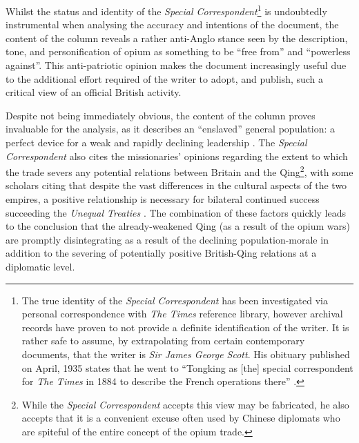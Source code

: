 \documentclass{article}
\begin{document}
        Whilst the status and identity of the \textit{Special Correspondent}\footnote{The true identity of the \textit{Special Correspondent} has been investigated via personal correspondence with \textit{The Times} reference library, however archival records have proven to not provide a definite identification of the writer. It is rather safe to assume, by extrapolating from certain contemporary documents, that the writer is \textit{Sir James George Scott}. His obituary published on  April, 1935 states that he went to ``Tongking as  [the] special correspondent for \textit{The Times} in 1884 to describe the French operations there'' \autocites{TheTimes:1935}{Scott:1885}.} is undoubtedly instrumental when analysing the accuracy and intentions of the document, the content of the column reveals a rather anti-Anglo stance seen by the description, tone, and personification of opium as something to be ``free from'' and ``powerless against''. This anti-patriotic opinion makes the document increasingly useful due to the additional effort required of the writer to adopt, and publish, such a critical view of an official British activity.

        Despite not being immediately obvious, the content of the column proves invaluable for the analysis, as it describes an ``enslaved'' general population: a perfect device for a weak and rapidly declining leadership \autocite{Rotberg:2003}. The \textit{Special Correspondent} also cites the missionaries' opinions regarding the extent to which the trade severs any potential relations between Britain and the Qing\footnote{While the \textit{Special Correspondent} accepts this view may be fabricated, he also accepts that it is a convenient excuse often used by Chinese diplomats who are spiteful of the entire concept of the opium trade.}, with some scholars citing that despite the vast differences in the cultural aspects of the two empires, a positive relationship is necessary for bilateral continued success succeeding the \textit{Unequal Treaties} \autocite{Fairbank:1942}. The combination of these factors quickly leads to the conclusion that the already-weakened Qing (as a result of the opium wars) are promptly disintegrating as a result of the declining population-morale in addition to the severing of potentially positive British-Qing relations at a diplomatic level.
\end{document}
